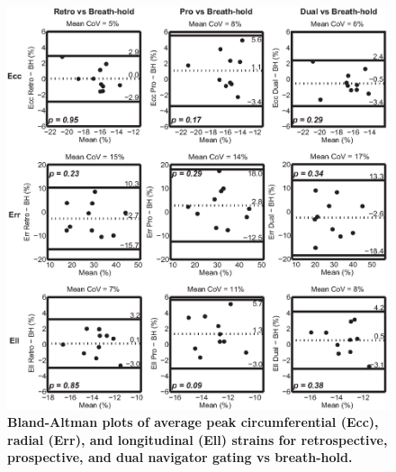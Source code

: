 	\begin{figure}
		\centering %
		\includegraphics{figures/navpaper/Fig3}
		\caption[Bland-Altman plots of average peak circumferential (Ecc), radial (Err), and longitudinal (Ell) strains for retrospective, prospective, and dual navigator gating vs breath-hold]{\textbf{Bland-Altman plots of average peak circumferential (Ecc), radial (Err), and longitudinal (Ell) strains for retrospective, prospective, and dual navigator gating vs breath-hold.}}
		\label{fig:nav_strain_bland_altman}
	\end{figure}
	

